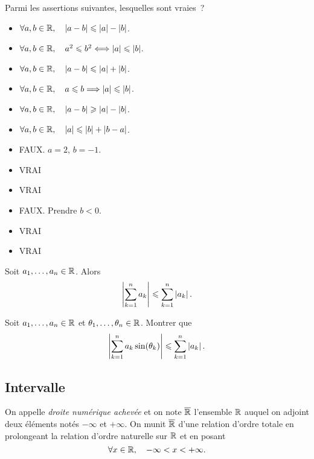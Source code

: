 \documentclass{magnolia}
\begin{document}
\begin{exoUnique}
\exo Parmi les assertions suivantes, lesquelles sont vraies~?
  \begin{multicols}{2}
  \begin{itemize}
  \item $\forall a,b\in\mathbb{R} ,\quad \left|a-b\right|\leqslant\left|a\right|-\left|b\right|$.
  \item $\forall a,b\in\mathbb{R} ,\quad a^2\leqslant b^2 \Longleftrightarrow \left|a\right|\leqslant\left|b\right|$.
  \item $\forall a,b\in\mathbb{R} ,\quad \left|a-b\right|\leqslant\left|a\right|+\left|b\right|$.
  \item $\forall a,b\in\mathbb{R} ,\quad a\leqslant b \Longrightarrow \left|a\right|\leqslant\left|b\right|$.
  \item $\forall a,b\in\mathbb{R} ,\quad \left|a-b\right|\geqslant\left|a\right|-\left|b\right|$.
  \item $\forall a,b\in\mathbb{R} ,\quad \left|a\right|\leqslant\left|b\right|+\left|b-a\right|$.
  \end{itemize}  
  \end{multicols}
\end{exoUnique}
\begin{sol}
\begin{itemize}
  \item FAUX. $a=2$, $b=-1$.
  \item VRAI
  \item VRAI
  \item FAUX. Prendre $b<0$.
  \item VRAI
  \item VRAI
  \end{itemize}  
  \end{sol}

\begin{proposition}
Soit $a_1,\ldots,a_n\in\mathbb{R}$. Alors
\[\left|\sum_{k=1}^n a_k\right|\leqslant \sum_{k=1}^n \left|a_k\right|.\]
\end{proposition}

\begin{exoUnique}
\exo Soit $a_1,\ldots,a_n\in\mathbb{R}$ et $\theta_1,\ldots,\theta_n\in\mathbb{R}$. Montrer
  que
  \[\left|\sum_{k=1}^n a_k \sin(\theta_k)\right|\leqslant\sum_{k=1}^n \left|a_k\right|.\]
\end{exoUnique}


\subsection{Intervalle}


\begin{definition}[utile=-3]
On appelle \emph{droite numérique achevée} et on note $\overline{\mathbb{R}}$ l'ensemble $\mathbb{R}$ auquel
on adjoint deux éléments notés $-\infty$ et $+\infty$. On munit $\overline{\mathbb{R}}$ d'une
relation d'ordre totale en prolongeant la relation d'ordre naturelle sur $\mathbb{R}$
et en posant
\[\forall x\in\mathbb{R} ,\quad -\infty<x<+\infty.\]
\end{definition}
\end{document}
